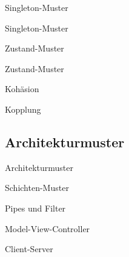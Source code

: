 \begin{defi}{Singleton-Muster}

\end{defi}

\begin{example}{Singleton-Muster}

\end{example}

\begin{defi}{Zustand-Muster}

\end{defi}

\begin{example}{Zustand-Muster}

\end{example}

\begin{defi}{Kohäsion}

\end{defi}

\begin{defi}{Kopplung}

\end{defi}

\subsection{Architekturmuster}

\begin{defi}{Architekturmuster}

\end{defi}

\begin{defi}{Schichten-Muster}

\end{defi}

\begin{defi}{Pipes und Filter}

\end{defi}

\begin{defi}{Model-View-Controller}

\end{defi}

\begin{defi}{Client-Server}

\end{defi}
